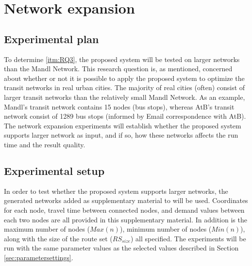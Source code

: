 \section{Network expansion}

\subsection{Experimental plan}
To determine \vref{itm:RQ3}, the proposed system will be tested on larger networks than the Mandl Network. This research question is, as mentioned, concerned about whether or not it is possible to apply the proposed system to optimize the transit networks in real urban cities. The majority of real cities (often) consist of larger transit networks than the relatively small Mandl Network. As an example, Mandl's transit network contains 15 nodes (bus stops), whereas AtB's transit network consist of 1289 bus stops (informed by Email correspondence with AtB). The network expansion experiments will establish whether the proposed system supports larger network as input, and if so, how these networks affects the run time and the result quality.



\subsection{Experimental setup}
\label{subsec:scalabilityExperiments_setup}

In order to test whether the proposed system supports larger networks, the generated networks added as supplementary material to \citet{mumford13} will be used. Coordinates for each node, travel time between connected nodes, and demand values between each two nodes are all provided in this supplementary material. In addition is the maximum number of nodes ($Max(n)$), minimum number of nodes ($Min(n)$), along with the size of the route set ($RS_{size}$) all specified. The experiments will be run with the same parameter values as the selected values described in Section \vref{sec:parametersettings}.


